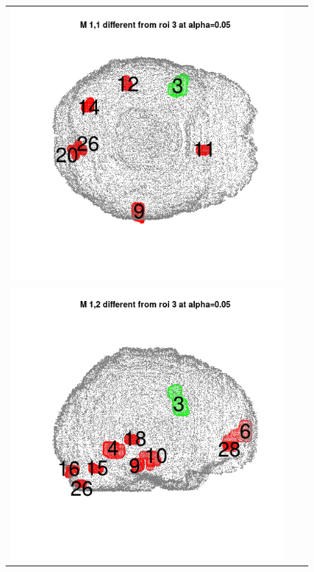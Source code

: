 \documentclass[12pt]{article}
\begin{document}
\begin{figure}[h]
\begin{tabular}{ccc}
\includegraphics[scale = 0.24]{../a7plots/d_1r_3_view3.png} \\ 
\includegraphics[scale = 0.24]{../a7plots/d_2r_3_view1.png} & 

\end{tabular}
\end{figure}
\end{document}
